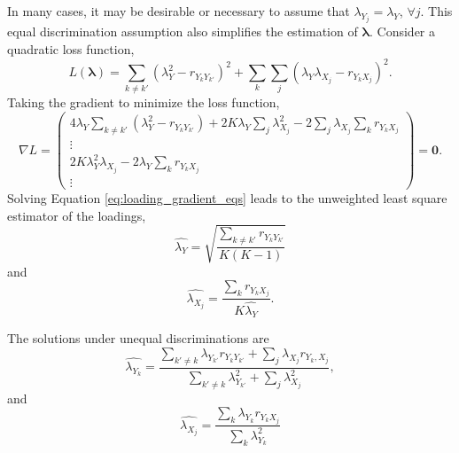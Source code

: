 \documentclass[man, floatsintext]{apa7}
\newcommand{\mbf}[1]{\bm{#1}}
\newcommand{\blambda}{\mbf{\lambda}}
\begin{document}
  In many cases, it may be desirable or necessary to assume that $\lambda_{Y_j} = \lambda_{Y}$, $\forall j$. This equal discrimination assumption also simplifies the estimation of $\blambda$. Consider a quadratic loss function,
  \begin{equation}
    L(\blambda) = \sum_{k \neq k'} (\lambda_{Y}^2 - r_{Y_k Y_{k'}})^2 + \sum_k \sum_j (\lambda_Y \lambda_{X_j} - r_{Y_k X_j})^2.
  \end{equation}
  Taking the gradient to minimize the loss function,
  \begin{equation}
  \label{eq:loading_gradient_eqs}
    \nabla L = \left(
    \begin{array}{c} 4\lambda_Y \sum_{k \neq k'}(\lambda_{Y}^{2} - r_{Y_k Y_{k'}}) + 2K\lambda_Y\sum_j\lambda_{X_j}^2 - 2\sum_j \lambda_{X_j} \sum_k r_{Y_k X_j}\\
    \vdots\\
    2K\lambda_Y^2\lambda_{X_j} - 2\lambda_Y\sum_k r_{Y_k X_j}\\
    \vdots
    \end{array}\right) = \mbf{0}.
  \end{equation}
  Solving Equation \ref{eq:loading_gradient_eqs} leads to the unweighted least square estimator of the loadings,
  \begin{equation}
    \hat{\lambda_Y} = \sqrt{\frac{\sum_{k \neq k'} r_{Y_k Y_{k'}}}{K(K-1)}}
  \end{equation}
  and
  \begin{equation}
    \hat{\lambda_{X_j}} = \frac{\sum_k r_{Y_k X_j}}{K\hat{\lambda_Y}}.
  \end{equation}

  The solutions under unequal discriminations are
  \begin{equation}
    \hat{\lambda_{Y_k}} = \frac{\sum_{k' \neq k} \lambda_{Y_{k'}} r_{Y_{k}Y_{k'}} +
    \sum_j \lambda_{X_j} r_{Y_k, X_j}}{\sum_{k' \neq k} \lambda_{Y_{k'}}^2 + \sum_j
    \lambda_{X_j}^2},
  \end{equation} 
  and
  \begin{equation}
    \hat{\lambda_{X_j}} = \frac{\sum_k \lambda_{Y_k} r_{Y_k X_j}}{\sum_k \lambda_
    {Y_k}^2}
  \end{equation}

  
  
\end{document}

